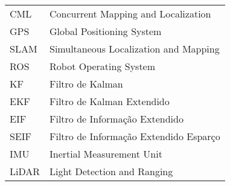 \begin{longtable}{ll}
CML & Concurrent Mapping and Localization \\
GPS & Global Positioning System \\
SLAM & Simultaneous Localization and Mapping\\
ROS & Robot Operating System\\
KF & Filtro de Kalman\\
EKF & Filtro de Kalman Extendido\\
EIF & Filtro de Informação Extendido\\
SEIF & Filtro de Informação Extendido Esparço\\
IMU & Inertial Measurement Unit\\
LiDAR & Light Detection and Ranging\\
\end{longtable}

